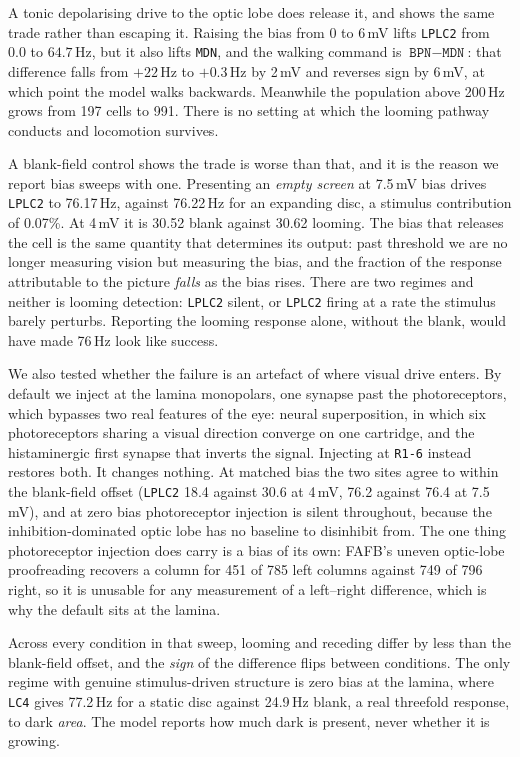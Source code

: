\documentclass[10pt,twoside]{article}
\newcommand{\cell}[1]{\texttt{#1}}
\begin{document}
A tonic depolarising drive to the optic lobe does release it, and shows the
same trade rather than escaping it. Raising the bias from 0 to 6\,mV lifts
\cell{LPLC2} from $0.0$ to $64.7$\,Hz, but it also lifts \cell{MDN}, and the
walking command is $\cell{BPN}-\cell{MDN}$: that difference falls from
$+22$\,Hz to $+0.3$\,Hz by 2\,mV and reverses sign by 6\,mV, at which point the
model walks backwards. Meanwhile the population above 200\,Hz grows from 197
cells to 991. There is no setting at which the looming pathway conducts and
locomotion survives.

A blank-field control shows the trade is worse than that, and it is the reason
we report bias sweeps with one. Presenting an \emph{empty screen} at
7.5\,mV bias drives \cell{LPLC2} to 76.17\,Hz, against 76.22\,Hz for an
expanding disc, a stimulus contribution of 0.07\%. At 4\,mV it is 30.52 blank
against 30.62 looming. The bias that releases the cell is the same quantity that
determines its output: past threshold we are no longer measuring vision but
measuring the bias, and the fraction of the response attributable to the picture
\emph{falls} as the bias rises. There are two regimes and neither is looming
detection: \cell{LPLC2} silent, or \cell{LPLC2} firing at a rate the stimulus
barely perturbs. Reporting the looming response alone, without the blank, would
have made 76\,Hz look like success.

We also tested whether the failure is an artefact of where visual drive enters.
By default we inject at the lamina monopolars, one synapse past the
photoreceptors, which bypasses two real features of the eye: neural
superposition, in which six photoreceptors sharing a visual direction converge
on one cartridge, and the histaminergic first synapse that inverts the signal.
Injecting at \cell{R1-6} instead restores both. It changes nothing. At matched
bias the two sites agree to within the blank-field offset (\cell{LPLC2} 18.4
against 30.6 at 4\,mV, 76.2 against 76.4 at 7.5\,mV), and at zero bias
photoreceptor injection is silent throughout, because the inhibition-dominated
optic lobe has no baseline to disinhibit from. The one thing photoreceptor
injection does carry is a bias of its own: FAFB's uneven optic-lobe
proofreading recovers a column for 451 of 785 left columns against 749 of 796
right, so it is unusable for any measurement of a left--right difference, which
is why the default sits at the lamina.

Across every condition in that sweep, looming and receding differ by less than
the blank-field offset, and the \emph{sign} of the difference flips between
conditions. The only regime with genuine stimulus-driven structure is zero bias
at the lamina, where \cell{LC4} gives 77.2\,Hz for a static disc against
24.9\,Hz blank, a real threefold response, to dark \emph{area}. The model
reports how much dark is present, never whether it is growing.
\end{document}
